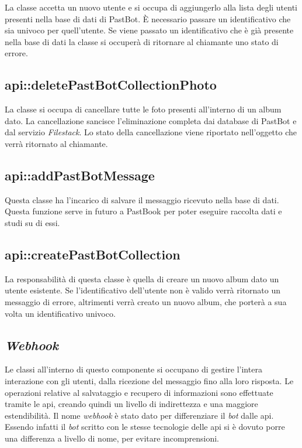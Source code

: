 La classe accetta un nuovo utente e si occupa di aggiungerlo alla lista
degli utenti presenti nella base di dati di PastBot. È necessario passare un
identificativo che sia univoco per quell'utente. Se viene passato un
identificativo che è già presente nella base di dati la classe si occuperà di
ritornare al chiamante uno stato di errore.

\subsection{api::deletePastBotCollectionPhoto}

La classe si occupa di cancellare tutte le foto presenti all'interno di un
album dato. La cancellazione sancisce l'eliminazione completa dai database di
PastBot e dal servizio \textit{Filestack}.
Lo stato della cancellazione viene riportato nell'oggetto che verrà ritornato
al chiamante.

\subsection{api::addPastBotMessage}

Questa classe ha l'incarico di salvare il messaggio ricevuto nella base di
dati. Questa funzione serve in futuro a PastBook per poter eseguire raccolta
dati e studi su di essi.

\subsection{api::createPastBotCollection}

La responsabilità di questa classe è quella di creare un nuovo album dato un
utente esistente. Se l'identificativo dell'utente non è valido verrà ritornato
un messaggio di errore, altrimenti verrà creato un nuovo album, che porterà a
sua volta un identificativo univoco.

\subsection{\textit{Webhook}}

Le classi all'interno di questo componente si occupano di gestire l'intera
interazione con gli utenti, dalla ricezione del messaggio fino alla loro
risposta. Le operazioni relative al salvataggio e recupero di informazioni sono
effettuate tramite le \gls{api}, creando quindi un livello di indirettezza e una
maggiore estendibilità.
Il nome \textit{webhook} è stato dato per differenziare il \textit{bot} dalle
\gls{api}. Essendo infatti il \textit{bot} scritto con le stesse tecnologie
delle \gls{api} si è dovuto porre una differenza a livello di nome, per evitare
incomprensioni.


